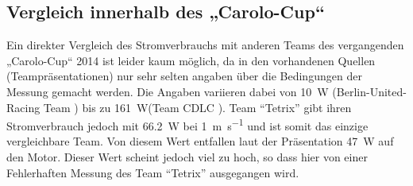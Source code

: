 \subsection{Vergleich innerhalb des „Carolo-Cup“}
Ein direkter Vergleich des Stromverbrauchs mit anderen Teams des vergangenden „Carolo-Cup“ 2014 ist leider kaum möglich, da in den vorhandenen Quellen (Teampräsentationen) nur sehr selten
angaben über die Bedingungen der Messung gemacht werden. Die Angaben variieren dabei von \SI{10}{\W} (Berlin-United-Racing Team \cite{cc_bu}) bis zu \SI{161}{\W}(Team CDLC \cite{cc-cdlc}).
Team ``Tetrix''\cite{cc-tx} gibt ihren Stromverbrauch jedoch mit \SI{66,2}{\W} bei \SI{1}{\metre\per\second} und ist somit das einzige vergleichbare Team. Von diesem Wert entfallen
laut der Präsentation \SI{47}{\W} auf den Motor. Dieser Wert scheint jedoch viel zu hoch, so dass hier von einer Fehlerhaften Messung des Team ``Tetrix'' ausgegangen wird.

